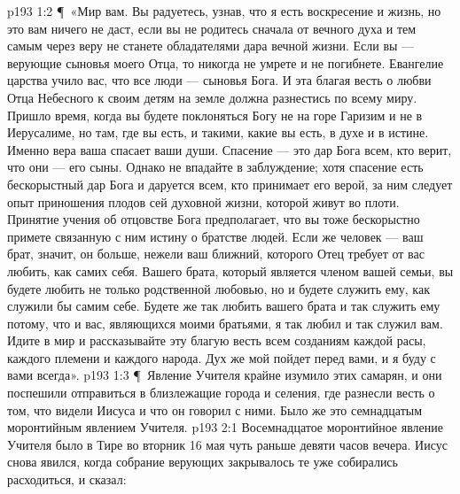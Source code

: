 \vs p193 1:2 \P\ «Мир вам. Вы радуетесь, узнав, что я есть воскресение и жизнь, но это вам ничего не даст, если вы не родитесь сначала от вечного духа и тем самым через веру не станете обладателями дара вечной жизни. Если вы --- верующие сыновья моего Отца, то никогда не умрете и не погибнете. Евангелие царства учило вас, что все люди --- сыновья Бога. И эта благая весть о любви Отца Небесного к своим детям на земле должна разнестись по всему миру. Пришло время, когда вы будете поклоняться Богу не на горе Гаризим и не в Иерусалиме, но там, где вы есть, и такими, какие вы есть, в духе и в истине. Именно вера ваша спасает ваши души. Спасение --- это дар Бога всем, кто верит, что они --- его сыны. Однако не впадайте в заблуждение; хотя спасение есть бескорыстный дар Бога и даруется всем, кто принимает его верой, за ним следует опыт приношения плодов сей духовной жизни, которой живут во плоти. Принятие учения об отцовстве Бога предполагает, что вы тоже бескорыстно примете связанную с ним истину о братстве людей. Если же человек --- ваш брат, значит, он больше, нежели ваш ближний, которого Отец требует от вас любить, как самих себя. Вашего брата, который является членом вашей семьи, вы будете любить не только родственной любовью, но и будете служить ему, как служили бы самим себе. Будете же так любить вашего брата и так служить ему потому, что и вас, являющихся моими братьями, я так любил и так служил вам. Идите в мир и рассказывайте эту благую весть всем созданиям каждой расы, каждого племени и каждого народа. Дух же мой пойдет перед вами, и я буду с вами всегда».
\vs p193 1:3 \P\ Явление Учителя крайне изумило этих самарян, и они поспешили отправиться в близлежащие города и селения, где разнесли весть о том, что видели Иисуса и что он говорил с ними. Было же это семнадцатым моронтийным явлением Учителя.
\vs p193 2:1 Восемнадцатое моронтийное явление Учителя было в Тире во вторник 16 мая чуть раньше девяти часов вечера. Иисус снова явился, когда собрание верующих закрывалось те уже собирались расходиться, и сказал:
